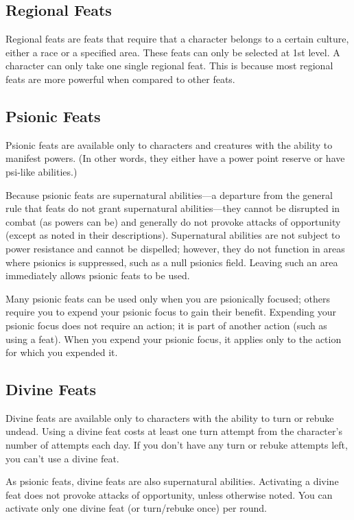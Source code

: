 \subsection{Regional Feats}
Regional feats are feats that require that a character belongs to a certain culture, either a race or a specified area. These feats can only be selected at 1st level. A character can only take one single regional feat. This is because most regional feats are more powerful when compared to other feats.

\subsection{Psionic Feats}
Psionic feats are available only to characters and creatures with the ability to manifest powers. (In other words, they either have a power point reserve or have psi-like abilities.)

Because psionic feats are supernatural abilities---a departure from the general rule that feats do not grant supernatural abilities---they cannot be disrupted in combat (as powers can be) and generally do not provoke attacks of opportunity (except as noted in their descriptions). Supernatural abilities are not subject to power resistance and cannot be dispelled; however, they do not function in areas where psionics is suppressed, such as a null psionics field. Leaving such an area immediately allows psionic feats to be used.

Many psionic feats can be used only when you are psionically focused; others require you to expend your psionic focus to gain their benefit. Expending your psionic focus does not require an action; it is part of another action (such as using a feat). When you expend your psionic focus, it applies only to the action for which you expended it.

\subsection{Divine Feats}
Divine feats are available only to characters with the ability to turn or rebuke undead. Using a divine feat costs at least one turn attempt from the character's number of attempts each day. If you don't have any turn or rebuke attempts left, you can't use a divine feat.

As psionic feats, divine feats are also supernatural abilities. Activating a divine feat does not provoke attacks of opportunity, unless otherwise noted. You can activate only one divine feat (or turn/rebuke once) per round.

